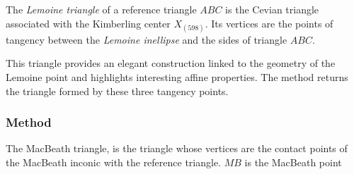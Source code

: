 The \emph{Lemoine triangle} of a reference triangle $ABC$ is the Cevian triangle associated with the Kimberling center $X_{(598)}$. Its vertices are the points of tangency between the \emph{Lemoine inellipse} and the sides of triangle $ABC$.

\medskip

This triangle provides an elegant construction linked to the geometry of the Lemoine point and highlights interesting affine properties. The method returns the triangle formed by these three tangency points.

\vspace{1em}
\begin{tkzexample}[latex=.5\textwidth]
\end{tkzexample}

\subsubsection{Method }
\label{ssub:method_triangle_macbeath}
The MacBeath triangle, is the triangle whose vertices are the contact points of the MacBeath inconic with the reference triangle. $MB$ is the MacBeath  point

\begin{tkzexample}[latex=.5\textwidth]
\end{tkzexample}




